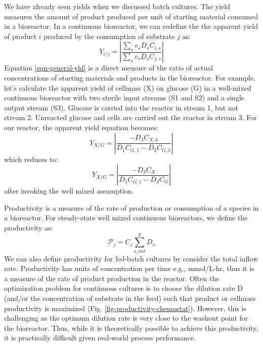 \documentclass[11pt]{article}
\theoremstyle{definition}
\begin{document}
We have already seen yields when we discussed batch cultures.
The yield measures the amount of product produced per unit of starting material consumed in a bioreactor. In a continuous bioreactor,
we can redefine the the apparent yield of product $i$ produced by the consumption of substrate $j$ as:
\begin{equation}\label{eqn-general-yld}
	Y_{i/j} = \left|\frac{\sum_{s}v_{s}D_{s}C_{i,s}}{\sum_{s}v_{s}D_{s}C_{j,s}}\right|
\end{equation}Equation \eqref{eqn-general-yld} is a direct measure of the ratio of actual concentrations of starting materials and products in the bioreactor.
For example, let's calculate the apparent yield of cellmass (X) on glucose (G) in a well-mixed continuous bioreactor with two sterile input streams (S1 and S2) and a single output stream (S3). Glucose is carried into the reactor in stream 1, but not stream 2. Unreacted glucose and cells are carried out the reactor in stream 3. For our reactor, the apparent yield equation becomes:
\begin{equation}
	Y_{X/G} = \left|\frac{-D_{3}C_{X,3}}{D_{1}C_{G,1} - D_{3}C_{G,3}}\right|
\end{equation}which reduces to:
\begin{equation}
	Y_{X/G} = \left|\frac{-D_{3}C_{X}}{D_{1}C_{G,1} - D_{3}C_{G}}\right|
\end{equation}after invoking the well mixed assumption.

Productivity is a measure of the rate of production or consumption of a species in a bioreactor.
For steady-state well mixed continuous bioreactors, we define the productivity as:
\begin{equation}
	\mathcal{P}_{j} = C_{j}\sum_{s,out}^{\mathcal{S}}D_{s}
\end{equation}We can also define productivity for fed-batch cultures by consider the total inflow rate.
Productivity has units of concentration per time e.g., mmol/L-hr, thus it is a measure of the rate of product production in the reactor.
Often the optimization problem for continuous cultures is to choose the dilution rate D (and/or the concentration of substrate in the feed)
such that product or cellmass productivity is maximized (Fig. \ref{fig-productivity-chemostat}).
However, this is challenging as the optimum dilution rate is very close to the washout point for the bioreactor.
Thus, while it is theoretically possible to achieve this productivity, it is practically difficult given real-world process performance.
\end{document}
